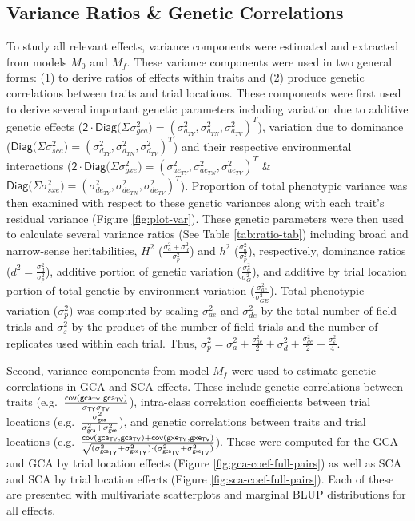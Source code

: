 \subsection{Variance Ratios \& Genetic Correlations}\label{variance-ratios-genetic-correlations}

To study all relevant effects, variance components were estimated and extracted from models \(M_0\) and \(M_f\). These variance components were used in two general forms: (1) to derive ratios of effects within traits and (2) produce genetic correlations between traits and trial locations. These components were first used to derive several important genetic parameters including variation due to additive genetic effects (\(\mathsf{ 2\cdot Diag(\Sigma} \sigma^2_{gca}\mathsf{)}=(\sigma^2_{a_{TY}},\sigma^2_{a_{TN}},\sigma^2_{a_{TV}})^T\)), variation due to dominance (\(\mathsf{ Diag(\Sigma} \sigma^2_{sca}\mathsf{)}=(\sigma^2_{d_{TY}},\sigma^2_{d_{TN}},\sigma^2_{d_{TV}})^T\)) and their respective environmental interactions (\(\mathsf{ 2\cdot Diag(\Sigma}\sigma^2_{gxe}\mathsf{)}=(\sigma^2_{ae_{TY}},\sigma^2_{ae_{TN}},\sigma^2_{ae_{TV}})^T\) \& \(\mathsf{ Diag(\Sigma}\sigma^2_{sxe}\mathsf{)}=(\sigma^2_{de_{TY}},\sigma^2_{de_{TN}},\sigma^2_{de_{TV}})^T\)). Proportion of total phenotypic variance was then examined with respect to these genetic variances along with each trait's residual variance (Figure \ref{fig:plot-var}). These genetic parameters were then used to calculate several variance ratios (See Table \ref{tab:ratio-tab}) including broad and narrow-sense heritabilities, \(H^2\) (\(\frac{\sigma^2_{a}+\sigma^2_{d}}{\sigma^2_p}\)) and \(h^2\) (\(\frac{\sigma^2_{a}}{\sigma^2_p}\)), respectively, dominance ratios (\(d^2 =\frac{\sigma^2_{d}}{\sigma^2_p}\)), additive portion of genetic variation (\(\frac{\sigma^2_{a}}{\sigma^2_G}\)), and additive by trial location portion of total genetic by environment variation (\(\frac{\sigma^2_{ae}}{\sigma^2_{GE}}\)). Total phenotypic variation (\(\sigma^2_p\)) was computed by scaling \(\sigma^2_{ae}\) and \(\sigma^2_{de}\) by the total number of field trials and \(\sigma^2_{\varepsilon}\) by the product of the number of field trials and the number of replicates used within each trial. Thus, \(\sigma^2_p =\sigma^2_{a}+\frac{\sigma^2_{ae}}{2}+\sigma^2_{d} +\frac{\sigma^2_{de}}{2} + \frac{\sigma^2_{\varepsilon}}{4}\).

Second, variance components from model \(M_f\) were used to estimate genetic correlations in GCA and SCA effects. These include genetic correlations between traits (e.g.~\(\frac{\sf cov(gca_{TY},gca_{TV})}{\sigma_{\sf TY}\sigma_{\sf TV}}\)), intra-class correlation coefficients between trial locations (e.g.~\(\frac{\sigma^2_{\sf gca}}{\sigma^2_{\sf gca}+\sigma^2_{\sf gxe}}\)), and genetic correlations between traits and trial locations (e.g.~\(\frac{\sf cov(gca_{TY},gca_{TV})+cov(gxe_{TY},gxe_{TV})}{ \sqrt{(\sigma^2_{\sf gca_{TY}}+\sigma^2_{\sf gxe_{TY}})\cdot(\sigma^2_{\sf gca_{TV}}+\sigma^2_{\sf gxe_{TV}})}}\)). These were computed for the GCA and GCA by trial location effects (Figure \ref{fig:gca-coef-full-pairs}) as well as SCA and SCA by trial location effects (Figure \ref{fig:sca-coef-full-pairs}). Each of these are presented with multivariate scatterplots and marginal BLUP distributions for all effects.

